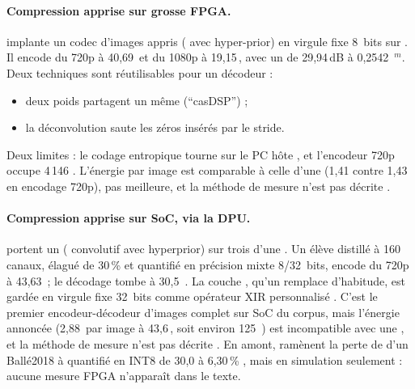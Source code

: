 \paragraph{Compression apprise sur grosse FPGA.} 
\citep{2022-sun-f-lic-fpga-learned-image} implante un codec d'images appris ( avec
hyper-prior) en virgule fixe 8~bits sur . Il encode du 720p à 40,69\, et du 1080p
à 19,15\,, avec un  de 29,94\,dB à 0,2542\, $^{m}$. Deux techniques
sont réutilisables pour un décodeur :
\begin{itemize}
  \item deux poids partagent un même  (\enquote{casDSP}) ;
  \item la déconvolution saute les zéros insérés par le stride.
\end{itemize}
Deux limites : le codage entropique tourne sur le PC hôte , et l'encodeur 720p
occupe 4\,146 . L'énergie par image est comparable à celle d'une  (1,41
contre 1,43\, en encodage 720p), pas meilleure, et la méthode de mesure n'est pas décrite
.

\paragraph{Compression apprise sur SoC, via la DPU.}
\citet{arxiv-2503.04832-lightweight-embedded-fpga-deployment-learned}\pp{} portent un 
( convolutif avec hyperprior) sur trois   d'une . Un élève distillé à
160 canaux, élagué de 30\,\% et quantifié en précision mixte 8/32~bits, encode du 720p à
43,63\,  ; le décodage tombe à 30,5\, . La couche , qu'un  remplace d'habitude, est gardée en
virgule fixe 32~bits comme opérateur XIR personnalisé . C'est le
premier encodeur-décodeur d'images complet sur SoC du corpus, mais l'énergie annoncée
(2,88\, par image à 43,6\,, soit environ 125\, \deduit) est incompatible avec une
, et la méthode de mesure n'est pas décrite . En amont,
\citet{arxiv-2511.17135-multi-stage-optimization-framework-deploying}\pp{} ramènent la
perte de  d'un Ballé2018 à  quantifié en INT8 de 30,0 à 6,30\,\% ,
mais en simulation seulement : aucune mesure FPGA n'apparaît dans le texte.

